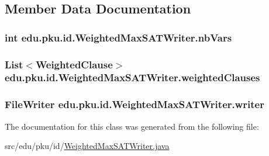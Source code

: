 \subsection{Member Data Documentation}
\hypertarget{classedu_1_1pku_1_1id_1_1_weighted_max_s_a_t_writer_ae9c3e5d651a1b8100fd5d85f00a18a54}{
\subsubsection[{nbVars}]{\setlength{\rightskip}{0pt plus 5cm}int {\bf edu.pku.id.WeightedMaxSATWriter.nbVars}}}
\label{classedu_1_1pku_1_1id_1_1_weighted_max_s_a_t_writer_ae9c3e5d651a1b8100fd5d85f00a18a54}
\hypertarget{classedu_1_1pku_1_1id_1_1_weighted_max_s_a_t_writer_a73dc99c36bfbaf938f3ffb7b95189d37}{
\subsubsection[{weightedClauses}]{\setlength{\rightskip}{0pt plus 5cm}List$<${\bf WeightedClause}$>$ {\bf edu.pku.id.WeightedMaxSATWriter.weightedClauses}}}
\label{classedu_1_1pku_1_1id_1_1_weighted_max_s_a_t_writer_a73dc99c36bfbaf938f3ffb7b95189d37}
\hypertarget{classedu_1_1pku_1_1id_1_1_weighted_max_s_a_t_writer_a6804c608ef104e3ee760359325c9fd55}{
\subsubsection[{writer}]{\setlength{\rightskip}{0pt plus 5cm}FileWriter {\bf edu.pku.id.WeightedMaxSATWriter.writer}}}
\label{classedu_1_1pku_1_1id_1_1_weighted_max_s_a_t_writer_a6804c608ef104e3ee760359325c9fd55}


The documentation for this class was generated from the following file:\begin{DoxyCompactItemize}
\item 
src/edu/pku/id/\hyperlink{_weighted_max_s_a_t_writer_8java}{WeightedMaxSATWriter.java}\end{DoxyCompactItemize}
